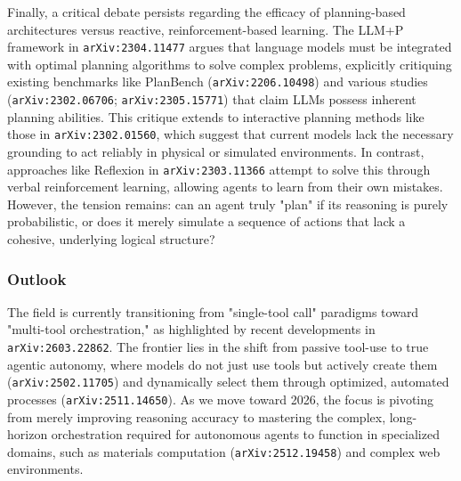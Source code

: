 \documentclass[11pt]{article}
\begin{document}
Finally, a critical debate persists regarding the efficacy of planning-based architectures versus reactive, reinforcement-based learning. The LLM+P framework in \texttt{arXiv:2304.11477} argues that language models must be integrated with optimal planning algorithms to solve complex problems, explicitly critiquing existing benchmarks like PlanBench (\texttt{arXiv:2206.10498}) and various studies (\texttt{arXiv:2302.06706}; \texttt{arXiv:2305.15771}) that claim LLMs possess inherent planning abilities. This critique extends to interactive planning methods like those in \texttt{arXiv:2302.01560}, which suggest that current models lack the necessary grounding to act reliably in physical or simulated environments. In contrast, approaches like Reflexion in \texttt{arXiv:2303.11366} attempt to solve this through verbal reinforcement learning, allowing agents to learn from their own mistakes. However, the tension remains: can an agent truly "plan" if its reasoning is purely probabilistic, or does it merely simulate a sequence of actions that lack a cohesive, underlying logical structure?

\subsubsection{Outlook}

The field is currently transitioning from "single-tool call" paradigms toward "multi-tool orchestration," as highlighted by recent developments in \texttt{arXiv:2603.22862}. The frontier lies in the shift from passive tool-use to true agentic autonomy, where models do not just use tools but actively create them (\texttt{arXiv:2502.11705}) and dynamically select them through optimized, automated processes (\texttt{arXiv:2511.14650}). As we move toward 2026, the focus is pivoting from merely improving reasoning accuracy to mastering the complex, long-horizon orchestration required for autonomous agents to function in specialized domains, such as materials computation (\texttt{arXiv:2512.19458}) and complex web environments.
\end{document}
